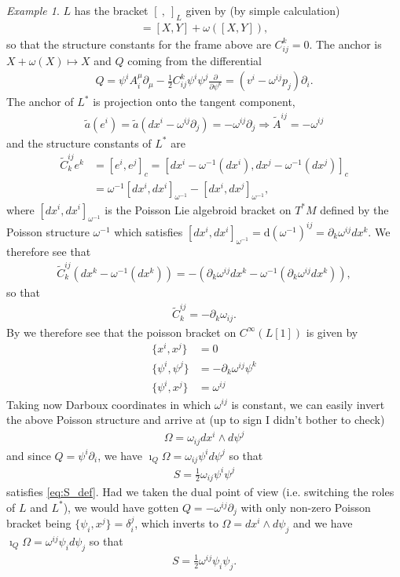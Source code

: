 \documentclass{article}
\newcommand{\brac}{[\ ,\ ]}
\def\w{\wedge}
\newcommand{\p}{\partial}
\newcommand{\rd}{\mathrm{d}}
\def\tl{\tilde}
\theoremstyle{definition}
\theoremstyle{definition}
\theoremstyle{remark}
\newtheorem{Ex}[theorem]{Example}
\theoremstyle{ref}
\begin{document}
\begin{Ex}
$L$ has the bracket $\brac_L$ given by (by simple calculation)
\begin{align*}
[X+\omega(X),Y+\omega(Y)]=[X,Y]+\omega([X,Y]),
\end{align*}
so that the structure constants for the frame above are $C_{ij}^k=0$. The anchor is $X+\omega(X)\mapsto X$ and $Q$ coming from the differential
\begin{align*}
Q=\psi^iA_i^\mu\p_\mu-\frac{1}{2}C_{ij}^k\psi^i\psi^j\frac{\p}{\p \psi^k}=(v^i-\omega^{ij}p_j)\p_i.
\end{align*}
The anchor of $L^*$ is projection onto the tangent component,
\begin{align*}
\tl{a}(e^i)=\tl{a}(dx^i-\omega^{ij}\p_j)=-\omega^{ij}\p_j \Longrightarrow \tl{A}^{ij}=-\omega^{ij}
\end{align*}
and the structure constants of $L^*$ are
\begin{align*}
\tl{C}^{ij}_ke^k&=[e^i,e^j]_c=[dx^i-\omega^{-1}(dx^i),dx^j-\omega^{-1}(dx^j)]_c\\
&=\omega^{-1}[dx^i,dx^i]_{\omega^{-1}}-[dx^i,dx^j]_{\omega^{-1}},
\end{align*}
where $[dx^i,dx^i]_{\omega^{-1}}$ is the Poisson Lie algebroid bracket on $T^*M$ defined by the Poisson structure $\omega^{-1}$ which satisfies $[dx^i,dx^i]_{\omega^{-1}}=\rd(\omega^{-1})^{ij}=\p_k\omega^{ij}dx^k$. We therefore see that
\begin{align*}
\tl{C}^{ij}_k(dx^k-\omega^{-1}(dx^k))=-(\p_k\omega^{ij}dx^k-\omega^{-1}(\p_k\omega^{ij}dx^k)),
\end{align*}
so that
\begin{align*}
\tl{C}^{ij}_k=-\p_k\omega_{ij}.
\end{align*}
By \cite[pg.~119]{weinsteingeomodels} we therefore see that the poisson bracket on $C^{\infty}(L[1])$ is given by
\begin{align*}
\{x^i,x^j\}&=0\\
\{\psi^i,\psi^j\}&=-\p_k\omega^{ij}\psi^k\\
\{\psi^i,x^j\}&=\omega^{ij}
\end{align*}
Taking now Darboux coordinates in which $\omega^{ij}$ is constant, we can easily invert the above Poisson structure and arrive at (up to sign I didn't bother to check)
\begin{align*}
\Omega=\omega_{ij}dx^i\w d\psi^j
\end{align*}
and since $Q=\psi^i\p_i$, we have $\imath_Q\Omega=\omega_{ij}\psi^i d\psi^j$ so that
\begin{align*}
S=\frac{1}{2}\omega_{ij}\psi^i\psi^j
\end{align*}
satisfies \eqref{eq:S_def}. Had we taken the dual point of view (i.e. switching the roles of $L$ and $L^*$), we would have gotten $Q=-\omega^{ij}\p_j$ with only non-zero Poisson bracket being $\{\psi_i,x^j\}=\delta_i^j$, which inverts to $\Omega=dx^i\w d\psi_j$ and we have $\imath_Q\Omega=\omega^{ij}\psi_i d\psi_j$ so that
\begin{align*}
S=\frac{1}{2}\omega^{ij}\psi_i \psi_j.
\end{align*}

\end{Ex}
\newpage
\end{document}
